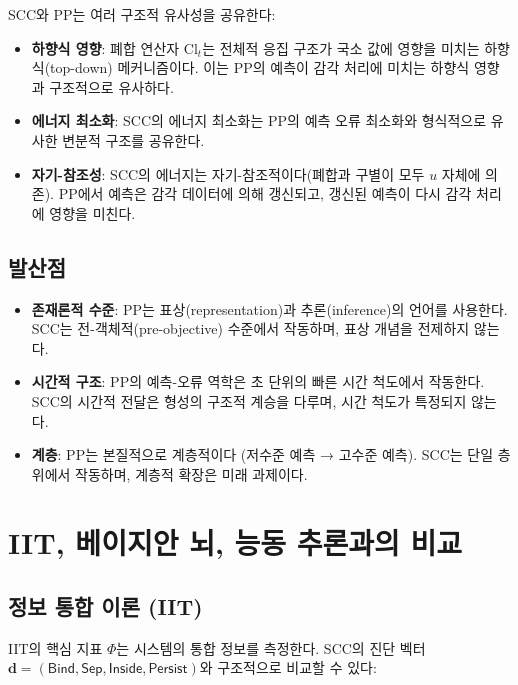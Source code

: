 SCC와 PP는 여러 구조적 유사성을 공유한다:
\begin{itemize}
    \item \textbf{하향식 영향}: 폐합 연산자 $\mathrm{Cl}_t$는 전체적 응집 구조가 국소 값에 영향을 미치는 하향식(top-down) 메커니즘이다. 이는 PP의 예측이 감각 처리에 미치는 하향식 영향과 구조적으로 유사하다.
    \item \textbf{에너지 최소화}: SCC의 에너지 최소화는 PP의 예측 오류 최소화와 형식적으로 유사한 변분적 구조를 공유한다.
    \item \textbf{자기-참조성}: SCC의 에너지는 자기-참조적이다(폐합과 구별이 모두 $u$ 자체에 의존). PP에서 예측은 감각 데이터에 의해 갱신되고, 갱신된 예측이 다시 감각 처리에 영향을 미친다.
\end{itemize}

\subsection{발산점}

\begin{itemize}
    \item \textbf{존재론적 수준}: PP는 표상(representation)과 추론(inference)의 언어를 사용한다. SCC는 전-객체적(pre-objective) 수준에서 작동하며, 표상 개념을 전제하지 않는다.
    \item \textbf{시간적 구조}: PP의 예측-오류 역학은 초 단위의 빠른 시간 척도에서 작동한다. SCC의 시간적 전달은 형성의 구조적 계승을 다루며, 시간 척도가 특정되지 않는다.
    \item \textbf{계층}: PP는 본질적으로 계층적이다 (저수준 예측 → 고수준 예측). SCC는 단일 층위에서 작동하며, 계층적 확장은 미래 과제이다.
\end{itemize}


\section{IIT, 베이지안 뇌, 능동 추론과의 비교}
\label{sec:other-frameworks}

\subsection{정보 통합 이론 (IIT)}

IIT의 핵심 지표 $\Phi$는 시스템의 통합 정보를 측정한다. SCC의 진단 벡터 $\mathbf{d} = (\mathsf{Bind}, \mathsf{Sep}, \mathsf{Inside}, \mathsf{Persist})$와 구조적으로 비교할 수 있다:


